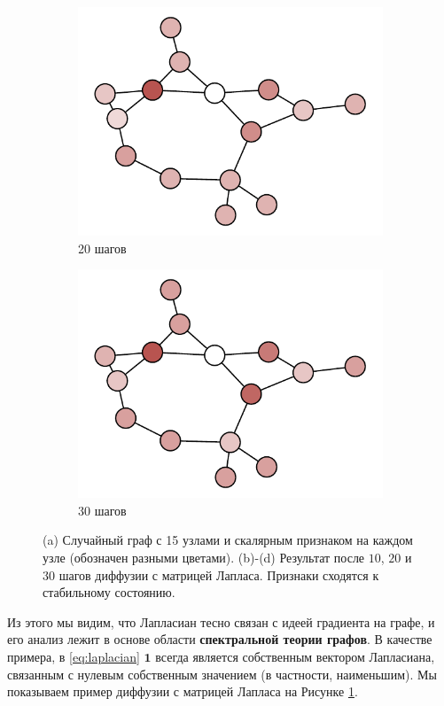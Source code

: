 \begin{figure}[t]
\begin{subfigure}[b]{0.24\textwidth}
    \includegraphics[width=\textwidth]{images/graph_diffusion_20}
    \caption{20 шагов}
    \end{subfigure}
    \begin{subfigure}[b]{0.24\textwidth}
    \includegraphics[width=\textwidth]{images/graph_diffusion_30}
    \caption{30 шагов}
    \end{subfigure}
    \caption{(a) Случайный граф с 15 узлами и скалярным признаком на каждом узле (обозначен разными цветами). (b)-(d) Результат после $10$, $20$ и $30$ шагов диффузии с матрицей Лапласа. Признаки сходятся к стабильному состоянию.}
    \label{fig:diffusion}
\end{figure}

Из этого мы видим, что Лапласиан тесно связан с идеей градиента на графе, и его анализ лежит в основе области \textbf{спектральной теории графов}. В качестве примера, в \eqref{eq:laplacian} $\mathbf{1}$ всегда является собственным вектором Лапласиана, связанным с нулевым собственным значением (в частности, наименьшим). Мы показываем пример диффузии с матрицей Лапласа на Рисунке \ref{fig:diffusion}.



